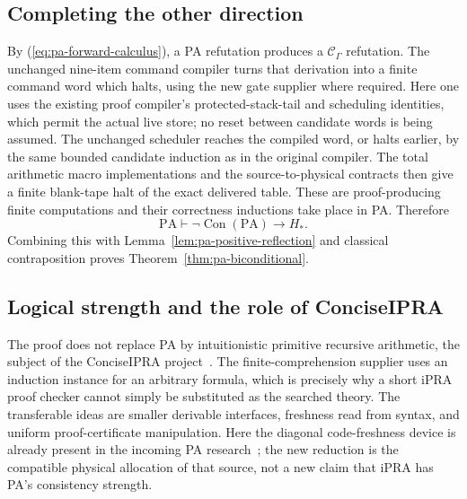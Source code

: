 \subsection{Completing the other direction}

By (\ref{eq:pa-forward-calculus}), a PA refutation produces a
$\mathcal C_\Gamma$ refutation. The unchanged nine-item command
compiler turns that derivation into a finite command word which
halts, using the new gate supplier where required. Here one uses
the existing proof compiler's protected-stack-tail and scheduling
identities, which permit the actual live store; no reset between
candidate words is being assumed. The unchanged scheduler reaches
the compiled word, or halts earlier, by the same bounded candidate
induction as in the original compiler. The total arithmetic macro implementations and
the source-to-physical contracts then give a finite blank-tape
halt of the exact delivered table. These are proof-producing
finite computations and their correctness inductions take place
in PA. Therefore
\[
 \mathrm{PA}\vdash
 \neg\operatorname{Con}(\mathrm{PA})\to H_*.
\]
Combining this with Lemma~\ref{lem:pa-positive-reflection} and
classical contraposition proves Theorem~\ref{thm:pa-biconditional}.

\subsection{Logical strength and the role of ConciseIPRA}

The proof does not replace PA by intuitionistic primitive recursive
arithmetic, the subject of the ConciseIPRA project~\cite{ipra}.
The finite-comprehension supplier uses an induction
instance for an arbitrary formula, which is precisely why a short
iPRA proof checker cannot simply be substituted as the searched
theory. The transferable ideas are smaller derivable interfaces,
freshness read from syntax, and uniform proof-certificate
manipulation. Here the diagonal code-freshness device is already
present in the incoming PA research~\cite{diagonal}; the new reduction is the
compatible physical allocation of that source, not a new claim
that iPRA has PA's consistency strength.
